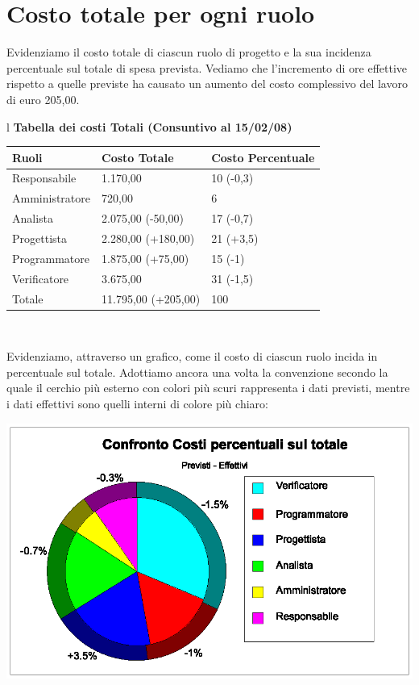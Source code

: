\documentclass[11pt,titlepage,a4paper]{report}
\begin{document}
\section{Costo totale per ogni ruolo}
Evidenziamo il costo totale di ciascun ruolo di progetto e la sua incidenza percentuale sul totale di spesa prevista. Vediamo che l'incremento di ore effettive rispetto a quelle previste ha causato un aumento del costo complessivo del lavoro di euro 205,00.

\begin{table}[hbtp]
\large{

\begin{tabular}{l}
\Large{\textbf{\textsf{Tabella dei costi Totali (Consuntivo al 15/02/08)}}} \\
\begin{tabular}{||p{4cm}||p{4cm}||p{4cm}||}
\hline
\textbf{Ruoli} & \textbf{Costo Totale}& \textbf{Costo Percentuale}\\
\hline
{Responsabile}&1.170,00&10 \footnotesize{(-0,3)}\\ 
\hline 
{Amministratore} &720,00&6\\ 
\hline
{Analista} &2.075,00 \footnotesize{(-50,00)}&17 \footnotesize{(-0,7)} \\
\hline
{Progettista} &2.280,00 \footnotesize{(+180,00)}&21 \footnotesize{(+3,5)} \\
\hline
{Programmatore} &1.875,00 \footnotesize{(+75,00)}&15 \footnotesize{(-1)}\\
\hline
{Verificatore} &3.675,00&31 \footnotesize{(-1,5)} \\
\hline
{Totale} &11.795,00 \footnotesize{(+205,00)}&100 \\
\hline

\end{tabular} \\
\end{tabular}
}
\end{table}

\newpage
Evidenziamo, attraverso un grafico, come il costo di ciascun ruolo incida in percentuale sul totale. Adottiamo ancora una volta la convenzione secondo la quale il cerchio pi\`u esterno con colori pi\`u scuri rappresenta i dati previsti, mentre i dati effettivi sono quelli interni di colore pi\`u chiaro:
\begin{center}
\includegraphics [width=1\textwidth] {confronti-costi-totale.eps}
\end{center}
\end{document}
